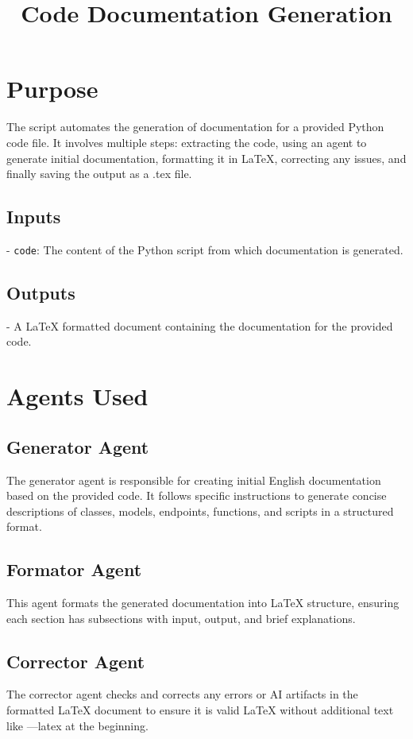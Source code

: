 \documentclass{article}
\begin{document}
\title{Code Documentation Generation}
\author{}
\date{}
\maketitle

\section{Purpose}
The script automates the generation of documentation for a provided Python code file. It involves multiple steps: extracting the code, using an agent to generate initial documentation, formatting it in LaTeX, correcting any issues, and finally saving the output as a .tex file.

\subsection{Inputs}
- \texttt{code}: The content of the Python script from which documentation is generated.

\subsection{Outputs}
- A LaTeX formatted document containing the documentation for the provided code.

\section{Agents Used}
\subsection{Generator Agent}
The generator agent is responsible for creating initial English documentation based on the provided code. It follows specific instructions to generate concise descriptions of classes, models, endpoints, functions, and scripts in a structured format.

\subsection{Formator Agent}
This agent formats the generated documentation into LaTeX structure, ensuring each section has subsections with input, output, and brief explanations.

\subsection{Corrector Agent}
The corrector agent checks and corrects any errors or AI artifacts in the formatted LaTeX document to ensure it is valid LaTeX without additional text like ---latex at the beginning.
\end{document}
